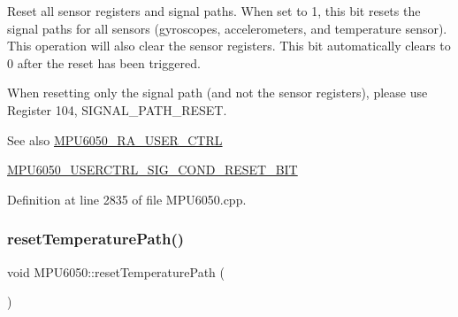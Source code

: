 Reset all sensor registers and signal paths. When set to 1, this bit resets the signal paths for all sensors (gyroscopes, accelerometers, and temperature sensor). This operation will also clear the sensor registers. This bit automatically clears to 0 after the reset has been triggered.

When resetting only the signal path (and not the sensor registers), please use Register 104, S\+I\+G\+N\+A\+L\+\_\+\+P\+A\+T\+H\+\_\+\+R\+E\+S\+ET.

\begin{DoxySeeAlso}{See also}
\mbox{\hyperlink{MPU6050_8h_acd4c638a6f677a42ecb9a3d7612d087a}{M\+P\+U6050\+\_\+\+R\+A\+\_\+\+U\+S\+E\+R\+\_\+\+C\+T\+RL}} 

\mbox{\hyperlink{MPU6050_8h_a19d39a5b4f64b95d9003c087ccbc6a67}{M\+P\+U6050\+\_\+\+U\+S\+E\+R\+C\+T\+R\+L\+\_\+\+S\+I\+G\+\_\+\+C\+O\+N\+D\+\_\+\+R\+E\+S\+E\+T\+\_\+\+B\+IT}} 
\end{DoxySeeAlso}


Definition at line 2835 of file M\+P\+U6050.\+cpp.


\begin{DoxyCode}{0}

\end{DoxyCode}
\mbox{\label{classMPU6050_a559c2d091d36a4e0489bc639916ddbb6}} 
\subsubsection{\texorpdfstring{resetTemperaturePath()}{resetTemperaturePath()}}
{\footnotesize\ttfamily void M\+P\+U6050\+::reset\+Temperature\+Path (\begin{DoxyParamCaption}{ }\end{DoxyParamCaption})}

